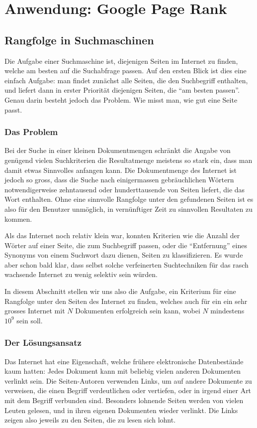 %
%
%
\section{Anwendung: Google Page Rank} \label{pagerank}

\subsection{Rangfolge in Suchmaschinen}
Die Aufgabe einer Suchmaschine ist, diejenigen Seiten im Internet zu
finden, welche am besten auf die Suchabfrage passen.
Auf den ersten
Blick ist dies eine einfach Aufgabe: man findet zunächst alle Seiten,
die den Suchbegriff enthalten, und liefert dann in erster Priorität
diejenigen Seiten, die ``am besten passen''.
Genau darin besteht jedoch
das Problem.
Wie misst man, wie gut eine Seite passt.

\subsubsection{Das Problem}
Bei der Suche in einer kleinen Dokumentmengen schränkt die Angabe von
genügend vielen Suchkriterien die Resultatmenge meistens so stark
ein, dass man damit etwas Sinnvolles anfangen kann.
Die Dokumentmenge
des Internet ist jedoch so gross, dass die Suche nach einigermassen
gebräuchlichen Wörtern notwendigerweise zehntausend oder hunderttausende
von Seiten liefert, die das Wort enthalten.
Ohne eine sinnvolle Rangfolge
unter den gefundenen Seiten ist es also für den Benutzer unmöglich, in
vernünftiger Zeit zu sinnvollen Resultaten zu kommen.

Als das Internet noch relativ klein war, konnten Kriterien wie die
Anzahl der Wörter auf einer Seite, die zum Suchbegriff passen,
oder die ``Entfernung'' eines Synonyms von einem Suchwort dazu dienen,
Seiten zu klassifizieren.
Es wurde aber schon bald klar, dass selbst
solche verfeinerten Suchtechniken für das rasch wachsende Internet
zu wenig selektiv sein würden.

In diesem Abschnitt stellen wir uns also die Aufgabe, ein Kriterium
für eine Rangfolge unter den Seiten des Internet zu finden, welches auch
für ein ein sehr grosses Internet mit $N$ Dokumenten erfolgreich sein kann,
wobei $N$ mindestens $10^9$ sein soll.

\subsubsection{Der Lösungsansatz}
Das Internet hat eine Eigenschaft, welche frühere elektronische 
Datenbestände kaum hatten: Jedes Dokument kann mit beliebig vielen anderen
Dokumenten verlinkt sein.
Die Seiten-Autoren verwenden Links, um auf
andere Dokumente zu verweisen, die einen Begriff verdeutlichen oder
vertiefen, oder in irgend einer Art mit dem Begriff verbunden sind.
Besonders lohnende Seiten werden von vielen Leuten gelesen, und in ihren
eigenen Dokumenten wieder verlinkt.
Die Links zeigen also jeweils zu den
Seiten, die zu lesen sich lohnt.

